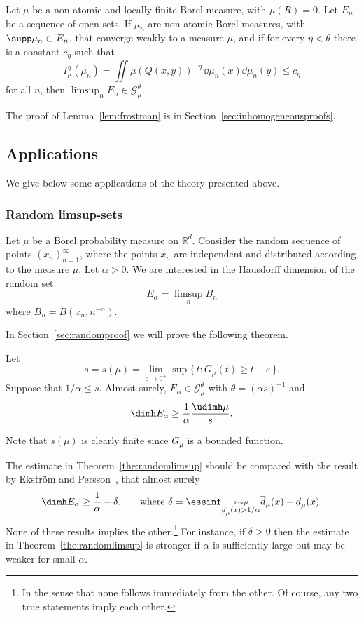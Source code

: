 \begin{lemm}\label{lem:frostman}
Let $\mu$ be a non-atomic and locally finite Borel measure, with $\mu (R) = 0$. Let $E_n$ be a sequence of open sets. If $\mu_n$ are non-atomic Borel measures, with $\supp \mu_n \subset E_n$, that converge weakly to a measure $\mu$, and if for every $\eta < \theta$ there is a constant $c_\eta$ such that
\[
I_\mu^\eta (\mu_n) = \iint \mu (Q(x,y))^{-\eta} \, \dd \mu_n (x) \dd \mu_n (y) \leq c_\eta
\]
for all $n$, then $\limsup_n E_n \in \mathscr{G}_\mu^\theta$.
\end{lemm}

The proof of Lemma~\ref{lem:frostman} is in Section~\ref{sec:inhomogeneousproofs}.

\subsection{Applications} \label{sec:applications}

We give below some applications of the theory presented above.

\subsubsection{Random limsup-sets} \label{sec:random}

Let $\mu$ be a Borel probability measure on $\mathbb{R}^d$. Consider the random sequence of points $(x_n)_{n=1}^\infty$, where the points $x_n$ are independent and distributed according to the measure $\mu$. Let $\alpha > 0$. We are interested in the Hausdorff dimension of the random set
\[
E_\alpha = \limsup_n B_n
\]
where $B_n = B(x_n,n^{-\alpha})$.

In Section~\ref{sec:randomproof} we will prove the following theorem.

\begin{theo}\label{the:randomlimsup}
Let
\[
s = s (\mu) = \lim_{\varepsilon \to 0^+} \sup \{\, t : G_\mu (t)
\geq t - \varepsilon \,\}.
\]
Suppose that $1/\alpha \leq s$. Almost surely, $E_\alpha \in
\mathscr{G}_\mu^\theta$ with $\theta = (\alpha s)^{-1}$ and
\[
\dimh E_\alpha \geq \frac{1}{\alpha} \frac{\udimh \mu}{s}.
\]
\end{theo}

Note that $s (\mu)$ is clearly finite since $G_\mu$ is a bounded function.

The estimate in Theorem~\ref{the:randomlimsup} should be compared with the result by Ekstr\"om and Persson~\cite[Theorem~1]{ekstrompersson}, that almost surely
\[
\dimh E_\alpha \geq \frac{1}{\alpha} - \delta. \qquad \text{where }
\delta = \essinf_{\substack{x \sim \mu \\ \underline{d}_\mu (x) > 1 /
\alpha}} \overline{d}_\mu (x) - \underline{d}_\mu (x).
\]
None of these results implies the other.\footnote{In the sense that none follows immediately from the other. Of course, any two true statements imply each other.} For instance, if $\delta > 0$ then the estimate in Theorem~\ref{the:randomlimsup} is stronger if $\alpha$ is sufficiently large but may be weaker for small $\alpha$.

